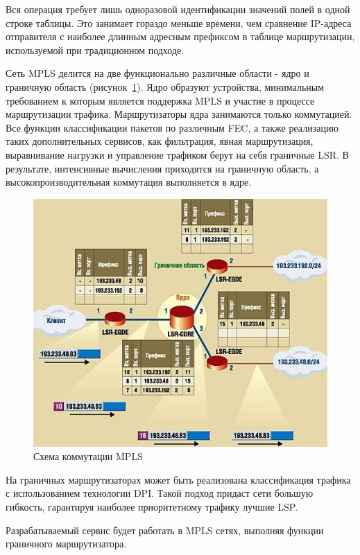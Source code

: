 Вся операция требует лишь одноразовой идентификации значений полей в одной строке таблицы. Это занимает гораздо меньше времени, чем сравнение IP-адреса отправителя с наиболее длинным адресным префиксом в таблице маршрутизации, используемой при традиционном подходе.

Сеть MPLS делится на две функционально различные области - ядро и граничную область (рисунок~\ref{pic:mpls_net_example}). Ядро образуют устройства, минимальным требованием к которым является поддержка MPLS и участие в процессе маршрутизации трафика. Маршрутизаторы ядра занимаются только коммутацией. Все функции классификации пакетов по различным FEC, а также реализацию таких дополнительных сервисов, как фильтрация, явная маршрутизация, выравнивание нагрузки и управление трафиком берут на себя граничные LSR.  В результате, интенсивные вычисления приходятся на граничную область, а высокопроизводительная коммутация выполняется в ядре.
\begin{figure}
\centering
\includegraphics[scale=0.55]{pictures/mpls_net_example}
\caption{Схема коммутации MPLS}
\label{pic:mpls_net_example}
\end{figure}

На граничных маршрутизаторах может быть реализована классификация трафика с использованием технологии DPI. Такой подход придаст сети большую гибкость, гарантируя наиболее приоритетному трафику лучшие LSP.

Разрабатываемый сервис будет работать в MPLS сетях, выполняя функции граничного маршрутизатора.


